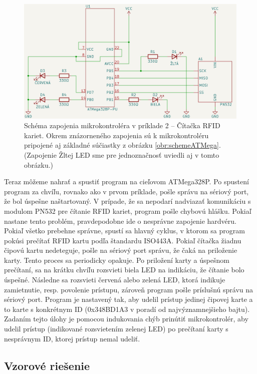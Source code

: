 \begin{figure}
    \centerline{\includegraphics[width=1\textwidth]{images/schemeRFID.png}}
    \caption[Schéma zapojenia mikrokontroléra v príklade 2]{Schéma zapojenia mikrokontroléra v príklade 2 -- Čítačka RFID kariet. Okrem znázorneného zapojenia sú k mikrokontroléru pripojené aj základné súčiastky z obrázku \ref{obr:schemeATMega}. (Zapojenie Žltej LED sme pre jednoznačnosť uviedli aj v tomto obrázku.)}
    \label{obr:schemeRFID}
\end{figure}

Teraz môžeme nahrať a spustiť program na cieľovom ATMega328P. Po spustení program za chvíľu, rovnako ako v prvom príklade, pošle správu na sériový port, že bol úspešne naštartovaný. V prípade, že sa nepodarí nadviazať komunikáciu s modulom PN532 pre čítanie RFID kariet, program pošle chybovú hlášku. Pokiaľ nastane tento problém, pravdepodobne ide o nesprávne zapojenie hardvéru. Pokiaľ všetko prebehne správne, spustí sa hlavný cyklus, v ktorom sa program pokúsi prečítať RFID kartu podľa štandardu ISO443A. Pokiaľ čítačka žiadnu čipovú kartu nedeteguje, pošle na sériový port správu, že čaká na priloženie karty. Tento proces sa periodicky opakuje. Po priložení karty a úspešnom prečítaní, sa na krátku chvíľu rozsvieti biela LED na indikáciu, že čítanie bolo úspešné. Následne sa rozsvieti červená alebo zelená LED, ktorá indikuje zamietnutie, resp. povolenie prístupu, zároveň program pošle príslušnú správu na sériový port. Program je nastavený tak, aby udelil prístup jedinej čipovej karte a to karte s konkrétnym ID (0x348BD1A3 v poradí od najvýznamnejšieho bajtu). Zadaním tejto úlohy je pomocou indukovania chýb prinútiť mikrokontrolér, aby udelil prístup (indikované rozsvietením zelenej LED) po prečítaní karty s nesprávnym ID, ktorej prístup nemal udeliť.

\subsection{Vzorové riešenie}